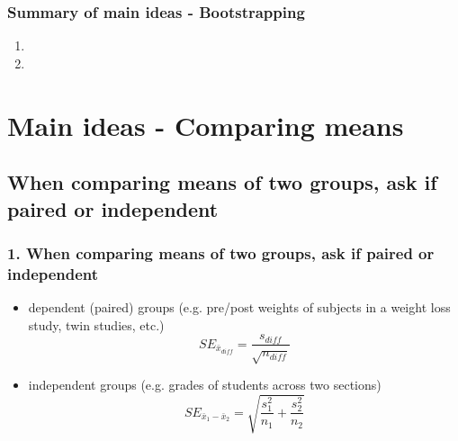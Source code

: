 \documentclass[slidestop,compress,mathserif,12pt,t,professionalfonts,xcolor=table]{beamer}
\begin{document}

\begin{frame}
\frametitle{Summary of main ideas - Bootstrapping}

\vfill

\begin{enumerate}

\item {}

\item {}

\end{enumerate}

\vfill

\end{frame}


\section{Main ideas - Comparing means}


\subsection{When comparing means of two groups, ask if paired or independent}
\label{mi1}


\begin{frame}
\frametitle{1. When comparing means of two groups, ask if paired or independent}

\begin{itemize}

\item dependent (paired) groups (e.g. pre/post weights of subjects in a weight loss study, twin studies, etc.)
\[ SE_{\bar{x}_{diff}} = \frac{s_{diff}}{\sqrt{n_{diff}}} \]

\item independent groups (e.g. grades of students across two sections)
\[ SE_{\bar{x}_1 - \bar{x}_2} = \sqrt{ \frac{s_1^2}{n_1} + \frac{s_2^2}{n_2} } \]

\end{itemize}


\end{frame}
\end{document}
